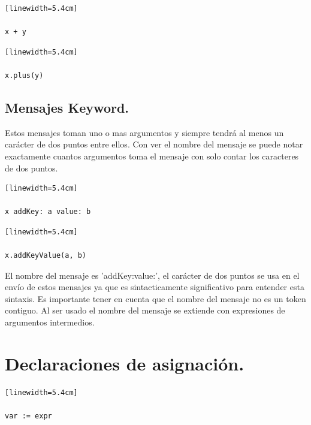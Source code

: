 \documentclass[10pt,journal,compsoc]{IEEEtran}
\begin{document}
\begin{lstlisting}[language=Smalltalk, caption = {Mensaje enviado en Smalltalk.}][linewidth=5.4cm]

x + y 

\end{lstlisting}

\begin{lstlisting}[caption = {Mensaje enviado en Java.}][linewidth=5.4cm]

x.plus(y)

\end{lstlisting}

\subsection{Mensajes Keyword.}
Estos mensajes toman uno o mas argumentos y siempre tendr\'a al menos un car\'acter de dos puntos entre ellos. Con ver el nombre del mensaje se puede notar exactamente cuantos argumentos toma el mensaje con solo contar los caracteres de dos puntos.

\begin{lstlisting}[language=Smalltalk, caption = {Mensaje enviado en Smalltalk.}][linewidth=5.4cm]

x addKey: a value: b

\end{lstlisting}

\begin{lstlisting}[caption = {Mensaje enviado en Java.}][linewidth=5.4cm]

x.addKeyValue(a, b)

\end{lstlisting}
El nombre del mensaje es 'addKey:value:', el car\'acter de dos puntos se usa en el env\'io de estos mensajes ya que es sintacticamente significativo para entender esta sintaxis.
Es importante tener en cuenta que el nombre del mensaje no es un token contiguo. Al ser usado el nombre del mensaje se extiende con expresiones de argumentos intermedios.

\section{Declaraciones de asignaci\'on.}

\begin{lstlisting}[language=Smalltalk, caption = {Sintaxis general de asignaci\'on.}][linewidth=5.4cm]

var := expr

\end{lstlisting}
\end{document}
